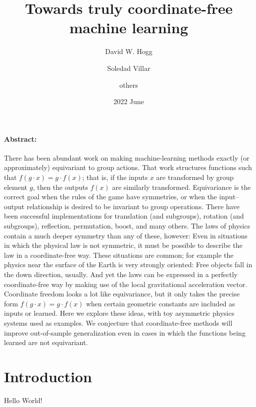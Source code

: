 \documentclass[12pt]{article}
\title{\bfseries%
  Towards truly coordinate-free\\ machine learning}
\author{%
  David W. Hogg \and
  Soledad Villar \and
  others}
\date{2022 June}
\begin{document}
\maketitle\thispagestyle{empty}

\paragraph{Abstract:}
There has been abundant work on making machine-learning methods exactly (or approximately) equivariant to group actions.
That work structures functions such that $f(g\cdot x) = g\cdot f(x)$; that is, if the inputs $x$ are transformed by group element $g$, then the outputs $f(x)$ are similarly transformed.
Equivariance is the correct goal when the rules of the game have symmetries, or when the input--output relationship is desired to be invariant to group operations.
There have been successful implementations for translation (and subgroups), rotation (and subgroups), reflection, permutation, boost, and many others.
The laws of physics contain a much deeper symmetry than any of these, however:
Even in situations in which the physical law is not symmetric, it must be possible to describe the law in a coordinate-free way.
These situations are common; for example the physics near the surface of the Earth is very strongly oriented:
Free objects fall in the down direction, usually.
And yet the laws can be expressed in a perfectly coordinate-free way by making use of the local gravitational acceleration vector.
Coordinate freedom looks a lot like equivariance, but it only takes the precise form $f(g\cdot x)=g\cdot f(x)$ when certain geometric constants are included as inputs or learned.
Here we explore these ideas, with toy asymmetric physics systems used as examples.
We conjecture that coordinate-free methods will improve out-of-sample generalization even in cases in which the functions being learned are not equivariant.

\section{Introduction}

Hello World!
\end{document}
